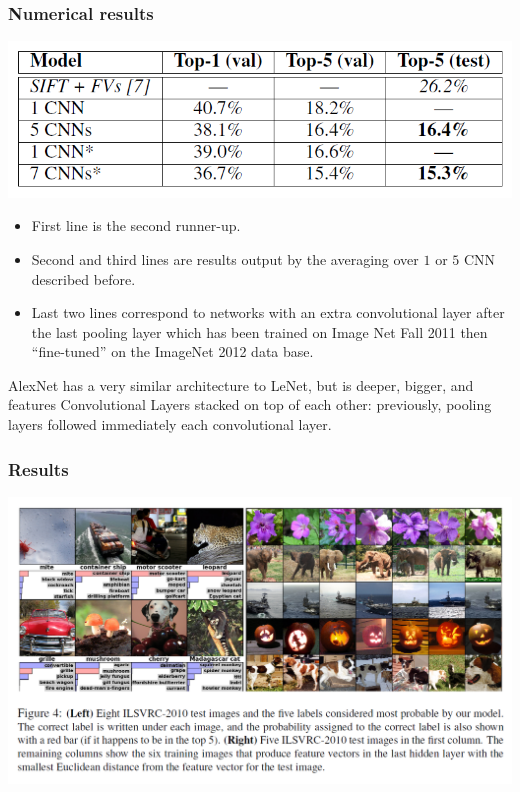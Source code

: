 \begin{frame}
	\frametitle{Numerical results}

	\begin{center}
		\includegraphics[scale=0.6]{figs/Alexnet_error}
	\end{center}



\bigskip

\begin{itemize}
	\item First line is the second runner-up.

	\item Second and third lines are results output by the averaging over $1$ or $5$ CNN described before.

	\item Last two lines correspond to networks with an extra convolutional layer after the last pooling layer which has been trained on Image Net Fall 2011 then ``fine-tuned'' on the ImageNet 2012 data base.
\end{itemize}


\bigskip

AlexNet has a very similar architecture to LeNet, but is deeper, bigger, and features Convolutional Layers stacked on top of each other: previously, pooling layers followed immediately each convolutional layer.

\end{frame}



\begin{frame}
	\frametitle{Results}

	\begin{center}
		\includegraphics[scale=0.7]{figs/AlexNet_results_images}
	\end{center}
\end{frame}








